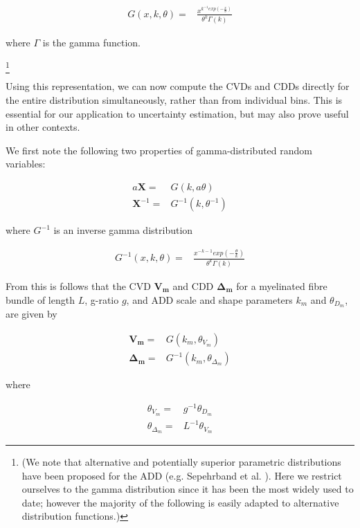 
\begin{eqnarray}
G(x,k,\theta) =& \frac{\displaystyle x^{k^{-1} exp(- \frac{\displaystyle x}{ \displaystyle \theta})}}{\displaystyle \theta^{k} \Gamma(k)} 
\end{eqnarray}

where $\Gamma$ is the gamma function. 

\footnote{(We note that alternative and potentially superior parametric distributions have been proposed for the ADD (e.g. Sepehrband et al. \citep{sepehrband2016parametric}). Here we restrict ourselves to the gamma distribution since it has been the most widely used to date; however the majority of the following is easily adapted to alternative distribution functions.)}



Using this representation, we can now compute the CVDs and CDDs directly for the entire distribution simultaneously, rather than from individual bins. This is essential for our application to uncertainty estimation, but may also prove useful in other contexts.


We first note the following two properties of gamma-distributed random variables: 

\begin{eqnarray}
a \mathbf{X} =& G(k,a \theta ) \\
\mathbf{X}^{-1} =& G^{-1}(k,\theta^{-1} )
\end{eqnarray}

where $G^{-1}$ is an inverse gamma distribution

\begin{eqnarray}
G^{-1}(x,k,\theta) =& \frac{\displaystyle x^{-k-1} exp(- \frac{\displaystyle \theta}{ \displaystyle k})}{\displaystyle \theta^{k} \Gamma(k)} 
\end{eqnarray}

From this is follows that the CVD $\mathbf{V_m}$ and CDD $\mathbf{\Delta_m}$ for a myelinated fibre bundle of length $L$, g-ratio $g$, and ADD scale and shape parameters $k_m$ and $\theta_{D_{m}}$, are given by 

\begin{eqnarray}
\mathbf{V_m} =& G(k_m, \theta_{V_{m}}) \\
\mathbf{\Delta_m} =& G^{-1}(k_m, \theta_{\Delta_{m}})
\end{eqnarray}

where 

\begin{eqnarray}
\theta_{V{_m}} =& g^{-1} \theta_{D_{m}}  \\
\theta_{\Delta{_m}} =& L^{-1} \theta_{V_{m}}
\end{eqnarray}

